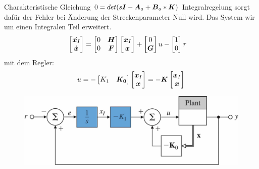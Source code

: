 \begin{tcolorbox}[colback=white!10!white,colframe=green!30!black,title=Integralregelung]
    Charakteristische Gleichung $0=det(s\boldsymbol{I}-\boldsymbol{A}_a+\boldsymbol{B}_a*\boldsymbol{K})$
    Integralregelung  sorgt dafür der Fehler bei Änderung der Streckenparameter Null wird. Das System wir um einen Integralen Teil erweitert.
    \begin{align*}
        \begin{bmatrix}
        \dot{    \boldsymbol{x}_I} \\ \dot{    \boldsymbol{x}}
        \end{bmatrix} &= \begin{bmatrix}
        0 & \boldsymbol{H} \\ 0 & \boldsymbol{F}
        \end{bmatrix}\begin{bmatrix}
            \boldsymbol{x}_I \\    \boldsymbol{x}
        \end{bmatrix}+
        \begin{bmatrix}
        0 \\ \boldsymbol{G}
        \end{bmatrix} u - \begin{bmatrix}
        1 \\ 0
        \end{bmatrix}r
    \end{align*}
    mit dem Regler:
    \begin{align*}
        u = -\begin{bmatrix}
         K_1 & \boldsymbol{K_0}
        \end{bmatrix} \begin{bmatrix}
            \boldsymbol{x}_I \\\boldsymbol{x}
        \end{bmatrix} = - \boldsymbol{K} \begin{bmatrix}
        \boldsymbol{x}_I \\\boldsymbol{x}
        \end{bmatrix}
    \end{align*}
    
    \begin{figure}[H]
\centering
\includegraphics[width=0.7\linewidth]{content/img/integral}


\end{figure}
\end{tcolorbox}
